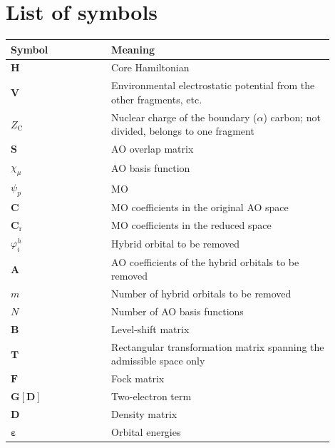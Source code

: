 \documentclass[11pt]{article}
\newcommand{\Hcore}{\mathbf H}
\newcommand{\Venv}{\mathbf V}
\newcommand{\Smat}{\mathbf S}
\newcommand{\Amat}{\mathbf A}
\newcommand{\Bmat}{\mathbf B}
\newcommand{\Tmat}{\mathbf T}
\newcommand{\Cmat}{\mathbf C}
\newcommand{\Cr}{\mathbf C_{\mathrm r}}
\newcommand{\Fmat}{\mathbf F}
\newcommand{\Dmat}{\mathbf D}
\newcommand{\Gmat}{\mathbf G}
\begin{document}
\section*{List of symbols}

\begin{longtable}{|p{0.28\linewidth}|p{0.62\linewidth}|}
\hline
\textbf{Symbol} & \textbf{Meaning} \\
\hline
\(\Hcore\) & Core Hamiltonian \\
\hline
\(\Venv\) & Environmental electrostatic potential from the other
fragments, etc. \\
\hline
\(Z_{\mathrm C}\) & Nuclear charge of the boundary (\(\alpha\)) carbon;
not divided, belongs to one fragment \\
\hline
\(\Smat\) & AO overlap matrix \\
\hline
\(\chi_\mu\) & AO basis function \\
\hline
\(\psi_p\) & MO \\
\hline
\(\Cmat\) & MO coefficients in the original AO space \\
\hline
\(\Cr\) & MO coefficients in the reduced space \\
\hline
\(\varphi_i^h\) & Hybrid orbital to be removed \\
\hline
\(\Amat\) & AO coefficients of the hybrid orbitals to be removed \\
\hline
\(m\) & Number of hybrid orbitals to be removed \\
\hline
\(N\) & Number of AO basis functions \\
\hline
\(\Bmat\) & Level-shift matrix \\
\hline
\(\Tmat\) & Rectangular transformation matrix spanning the admissible
space only \\
\hline
\(\Fmat\) & Fock matrix \\
\hline
\(\Gmat[\Dmat]\) & Two-electron term \\
\hline
\(\Dmat\) & Density matrix \\
\hline
\(\boldsymbol\varepsilon\) & Orbital energies \\
\hline
\end{longtable}
\end{document}
